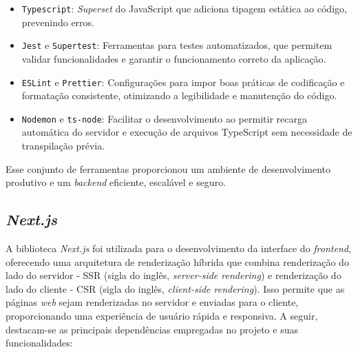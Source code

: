 \begin{itemize}
    \item \texttt{Typescript}: \textit{Superset} do JavaScript que adiciona tipagem estática ao código, prevenindo erros.
    \item \texttt{Jest} e \texttt{Supertest}: Ferramentas para testes automatizados, que permitem validar funcionalidades e garantir o funcionamento correto da aplicação.
    \item \texttt{ESLint} e \texttt{Prettier}: Configurações para impor boas práticas de codificação e formatação consistente, otimizando a legibilidade e manutenção do código.
    \item \texttt{Nodemon} e \texttt{ts-node}: Facilitar o desenvolvimento ao permitir recarga automática do servidor e execução de arquivos TypeScript sem necessidade de transpilação prévia.
\end{itemize}

Esse conjunto de ferramentas proporcionou um ambiente de desenvolvimento produtivo e um \textit{backend} eficiente, escalável e seguro.

\subsection{\textit{Next.js}}
A biblioteca \textit{Next.js} foi utilizada para o desenvolvimento da interface do \textit{frontend}, oferecendo uma arquitetura de renderização híbrida que combina renderização do lado do servidor - SSR (sigla do inglês, \textit{server-side rendering}) e renderização do lado do cliente - CSR (sigla do inglês, \textit{client-side rendering}). Isso permite que as páginas \textit{web} sejam renderizadas no servidor e enviadas para o cliente, proporcionando uma experiência de usuário rápida e responsiva. A seguir, destacam-se as principais dependências empregadas no projeto e suas funcionalidades:

